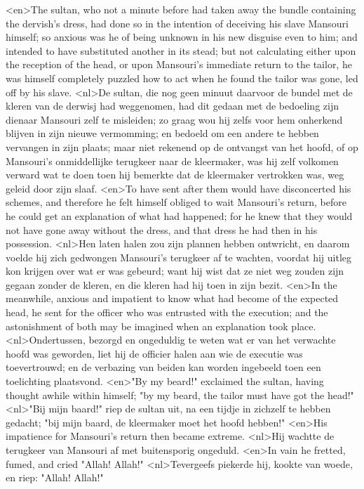 <en>The sultan, who not a minute before had taken away the bundle containing the dervish's dress, had done so in the intention of deceiving his slave Mansouri himself; so anxious was he of being unknown in his new disguise even to him; and intended to have substituted another in its stead; but not calculating either upon the reception of the head, or upon Mansouri's immediate return to the tailor, he was himself completely puzzled how to act when he found the tailor was gone, led off by his slave.
<nl>De sultan, die nog geen minuut daarvoor de bundel met de kleren van de derwisj had weggenomen, had dit gedaan met de bedoeling zijn dienaar Mansouri zelf te misleiden; zo graag wou hij zelfs voor hem onherkend blijven in zijn nieuwe vermomming; en bedoeld om een andere te hebben vervangen in zijn plaats; maar niet rekenend op de ontvangst van het hoofd, of op Mansouri's onmiddellijke terugkeer  naar de kleermaker, was hij zelf volkomen verward wat te doen toen hij bemerkte dat de kleermaker vertrokken was, weg geleid door zijn slaaf.
<en>To have sent after them would have disconcerted his schemes, and therefore he felt himself obliged to wait Mansouri's return, before he could get an explanation of what had happened; for he knew that they would not have gone away without the dress, and that dress he had then in his possession.
<nl>Hen laten halen zou zijn plannen hebben ontwricht, en daarom voelde hij zich gedwongen Mansouri's terugkeer af te wachten, voordat hij uitleg kon krijgen over wat er was gebeurd; want hij wist dat ze niet weg zouden zijn gegaan zonder de kleren, en die kleren  had hij toen in zijn bezit.
<en>In the meanwhile, anxious and impatient to know what had become of the expected head, he sent for the officer who was entrusted with the execution; and the astonishment of both may be imagined when an explanation took place.
<nl>Ondertussen, bezorgd en ongeduldig  te weten wat er van het verwachte hoofd was geworden, liet hij de officier halen aan wie de executie was toevertrouwd; en de verbazing van beiden kan worden ingebeeld toen een toelichting plaatsvond.
<en>"By my beard!" exclaimed the sultan, having thought awhile within himself; "by my beard, the tailor must have got the head!"
<nl>"Bij mijn baard!" riep de sultan uit, na een tijdje in zichzelf te hebben gedacht; "bij mijn baard, de kleermaker moet het hoofd hebben!"
<en>His impatience for Mansouri's return then became extreme.
<nl>Hij wachtte  de terugkeer van Mansouri af met  buitensporig ongeduld.
<en>In vain he fretted, fumed, and cried "Allah! Allah!"
<nl>Tevergeefs piekerde hij, kookte van woede, en riep: "Allah! Allah!"
